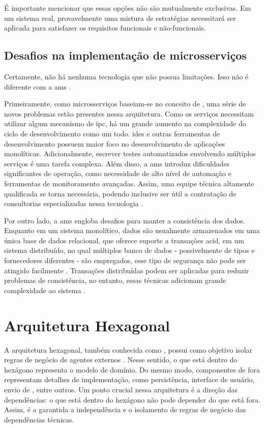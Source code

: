 É importante mencionar que essas opções não são mutualmente exclusivas. Em um sistema real, provavelmente uma mistura de estratégias necessitará ser aplicada para satisfazer os requisitos funcionais e não-funcionais.

\subsection{Desafios na implementação de microsserviços}
Certamente, não há nenhuma tecnologia que não possua limitações. Isso não é diferente com a \acrshort{ams} \cite{richardson2018microservices}. 

Primeiramente, como microsserviços baseiam-se no conceito de , uma série de novos problemas estão presentes nessa arquitetura. Como os serviços necessitam utilizar algum mecanismo de \acrshort{ipc}, há um grande aumento na complexidade do ciclo de desenvolvimento como um todo. \acrshort{ide}s e outras ferramentas de desenvolvimento possuem maior foco no desenvolvimento de aplicações monolíticas. Adicionalmente, escrever testes automatizados envolvendo múltiplos serviços é uma tarefa complexa. Além disso, a \acrshort{ams} introduz dificuldades significantes de operação, como necessidade de alto nível de automação e ferramentas de monitoramento avançadas. Assim, uma equipe técnica altamente qualificada se torna necessária, podendo inclusive ser útil a contratação de consultorias especializadas nessa tecnologia \cite{richardson2018microservices}.

Por outro lado, a \acrshort{ams} engloba desafios para manter a consistência dos dados. Enquanto em um sistema monolítico, dados são usualmente armazenados em uma única base de dados relacional, que oferece suporte a transações \acrshort{acid}, em um sistema distribuído, no qual múltiplos banco de dados - possivelmente de tipos e fornecedores diferentes - são empregados, esse tipo de segurança não pode ser atingido facilmente \cite{buildingMicroservices}. Transações distribuídas podem ser aplicadas para reduzir problemas de consistência, no entanto, essas técnicas adicionam grande complexidade ao sistema \cite{buildingMicroservices}.

\section{Arquitetura Hexagonal} 
\label{section:hexagonal}
A arquitetura hexagonal, também conhecida como , possui como objetivo isolar regras de negócio de agentes externos \cite{cockburn2005}. Nesse sentido, o que está dentro do hexágono representa o modelo de domínio. Do mesmo modo, componentes de fora representam detalhes de implementação, como persistência, interface de usuário, envio de , entre outros. Um ponto crucial nessa arquitetura é a direção das dependências: o que está dentro do hexágono não pode depender do que está fora. Assim, é a garantida a independência e o isolamento de regras de negócio das dependências técnicas.

